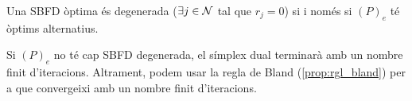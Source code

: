 \begin{prop}
    Una SBFD òptima és degenerada ($\exists j \in \mathcal{N}$ tal que $r_j = 0$) si i només si $\left(P\right)_e$ té òptims alternatius.
\end{prop}

\begin{prop}
    Si $\left(P\right)_e$ no té cap SBFD degenerada, el símplex dual terminarà amb un nombre finit d'iteracions. Altrament, podem usar la regla de Bland (\ref{prop:rgl_bland}) per a que convergeixi amb un nombre finit d'iteracions.
\end{prop}
